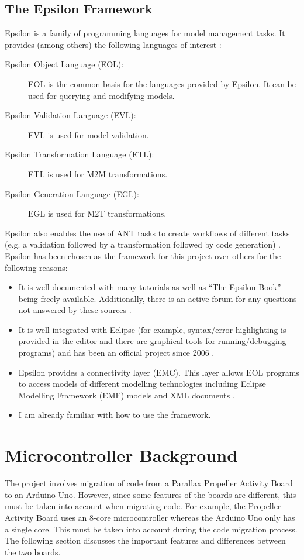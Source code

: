 \documentclass{UoYCSproject}
\begin{document}
\subsection{The Epsilon Framework}
Epsilon is a family of programming languages for model management tasks. It provides (among others) the following languages of interest \parencite{kolovos2010epsilon}:
\begin{description}
\item[Epsilon Object Language (EOL):] EOL is the common basis for the languages provided by Epsilon. It can be used for querying and modifying models.
\item[Epsilon Validation Language (EVL):] EVL is used for model validation.
\item[Epsilon Transformation Language (ETL):] ETL is used for M2M transformations.
\item[Epsilon Generation Language (EGL):] EGL is used for M2T transformations.
\end{description}
Epsilon also enables the use of ANT tasks to create workflows of different tasks (e.g. a validation followed by a
transformation followed by code generation) \parencite{kolovos2010epsilon}.
\newline
Epsilon has been chosen as the framework for this project over others for the following reasons:
\begin{itemize}
\item It is well documented with many tutorials as well as ``The Epsilon Book'' being freely available. Additionally, there is an active forum for any questions not answered by these sources \parencite{epsilonsite}.
\item It is well integrated with Eclipse (for example, syntax/error highlighting is provided in the editor and there are graphical tools for running/debugging programs) and has been an official project since 2006 \parencite{epsilonsite}.
\item Epsilon provides a connectivity layer (EMC). This layer allows EOL programs to access models of different modelling technologies including Eclipse Modelling Framework (EMF) models and XML documents \parencite{epsilonsite}.
\item I am already familiar with how to use the framework.
\end{itemize}

\section{Microcontroller Background}
The project involves migration of code from a Parallax Propeller Activity Board to an Arduino Uno. However, since some features of the boards are different, this must be taken into account when migrating code. For example, the Propeller Activity Board uses an 8-core microcontroller whereas the Arduino Uno only has a single core. This must be taken into account during the code migration process. The following section discusses the important features and differences between the two boards.
\end{document}
